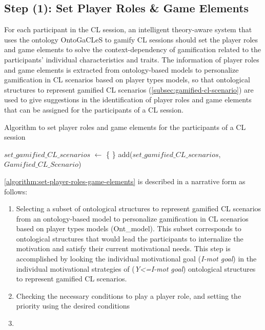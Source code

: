 \subsection{Step (1): Set Player Roles \& Game Elements}

For each participant in the CL session, an intelligent theory-aware system that uses the ontology OntoGaCLeS to gamify CL sessions should set the player roles and game elements to solve the context-dependency of gamification related to the participants' individual characteristics and traits. The information of player roles and game elements is extracted from ontology-based models to personalize gamification in CL scenarios based on player types models, so that ontological structures to represent gamified CL scenarios (\autoref{subsec:gamified-cl-scenario}) are used to give suggestions in the identification of player roles and game elements that can be assigned for the participants of a CL session.

\begin{algoritmo}
\caption{Algorithm to set player roles and game elements for the participants of a CL session}
\label{algorithm:set-player-roles-game-elements}
\begin{algorithmic}[1]\small
{}
  \State $set\_gamified\_CL\_scenarios$ $\gets$ \{ \}
          \State add($set\_gamified\_CL\_scenarios$, $Gamified\_CL\_Scenario$)
        \EndIf
      \EndFor
    \EndFor
  \EndFor
\EndProcedure
\end{algorithmic}
\end{algoritmo}

\autoref{algorithm:set-player-roles-game-elements} is described in a narrative form as follows:

\begin{enumerate}
\item
Selecting a subset of ontological structures to represent gamified CL scenarios from an ontology-based model to personalize gamification in CL scenarios based on player types models (Ont\_model). This subset corresponds to ontological structures that would lead the participants to internalize the motivation and satisfy their current motivational needs. This step is accomplished by looking the individual motivational goal (\emph{I-mot goal}) in the individual motivational strategies of (\emph{Y<=I-mot goal}) ontological structures to represent gamified CL scenarios.
\item 
Checking the necessary conditions to play a player role, and setting the priority using the desired conditions


\item 
\end{enumerate}


